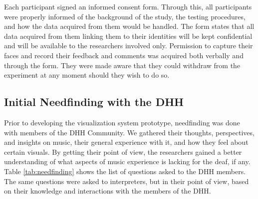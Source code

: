  Each participant signed an informed consent form. Through this, all participants were properly informed of the background of the study, the testing procedures, and how the data acquired from them would be handled. The form states that all data acquired from them linking them to their identities will be kept confidential and will be available to the researchers involved only. Permission to capture their faces and record their feedback and comments was acquired both verbally and through the form. They were made aware that they could withdraw from the experiment at any moment should they wish to do so. 
    
\subsection{Initial Needfinding with the DHH}
Prior to developing the visualization system prototype, needfinding was done with members of the DHH Community. We gathered their thoughts, perspectives, and insights on music, their general experience with it, and how they feel about certain visuals. By getting their point of view, the researchers gained a better understanding of what aspects of music experience is lacking for the deaf, if any. Table \ref{tab:needfinding} shows the list of questions asked to the DHH members. The same questions were asked to interpreters, but in their point of view, based on their knowledge and interactions with the members of the DHH.

